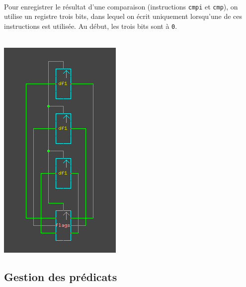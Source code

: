 \documentclass[11pt, a4paper, twoside, titlepage]{article}
\begin{document}
\paragraph{}
Pour enregistrer le résultat d'une comparaison (instructions \texttt{cmpi} et \texttt{cmp}), on utilise un registre trois bits, dans lequel on écrit uniquement lorsqu'une de ces instructions est utilisée. Au début, les trois bits sont à \texttt{0}.\\
\\
\centerline{\includegraphics[scale=.8]{flags}}

\subsection{Gestion des prédicats}
\end{document}

